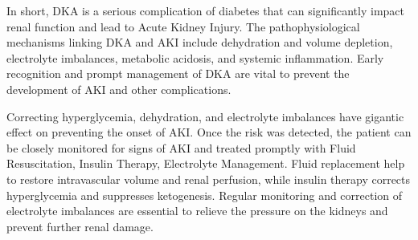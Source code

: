 \documentclass[../main.tex]{subfiles}
\begin{document}
In short, DKA is a serious complication of diabetes that can significantly impact renal function and lead to Acute Kidney Injury. 
The pathophysiological mechanisms linking DKA and AKI include dehydration and volume depletion, electrolyte imbalances, metabolic acidosis, and systemic inflammation. 
Early recognition and prompt management of DKA are vital to prevent the development of AKI and other complications.

Correcting hyperglycemia, dehydration, and electrolyte imbalances have gigantic effect on preventing the onset of AKI. 
Once the risk was detected, the patient can be closely monitored for signs of AKI and treated promptly with Fluid Resuscitation, Insulin Therapy, Electrolyte Management. 
Fluid replacement help to restore intravascular volume and renal perfusion, while insulin therapy corrects hyperglycemia and suppresses ketogenesis.
Regular monitoring and correction of electrolyte imbalances are essential to relieve the pressure on the kidneys and prevent further renal damage.


\end{document}
